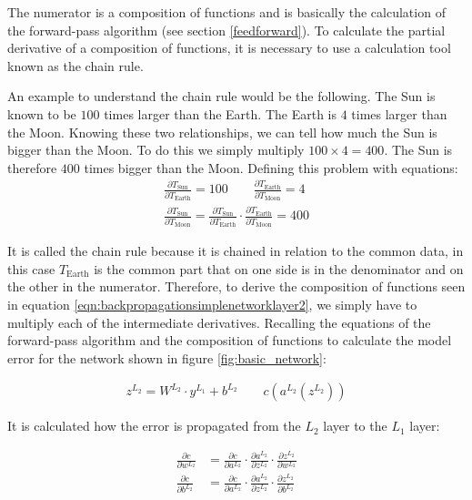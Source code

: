 The numerator is a composition of functions and is basically the calculation of the forward-pass algorithm (see section \ref{feedforward}). To calculate the partial derivative of a composition of functions, it is necessary to use a calculation tool known as the chain rule.
\newline


An example to understand the chain rule would be the following. The Sun is known to be $100$ times larger than the Earth. The Earth is $4$ times larger than the Moon. Knowing these two relationships, we can tell how much the Sun is bigger than the Moon. To do this we simply multiply $100 \times 4 = 400$. The Sun is therefore $400$ times bigger than the Moon. Defining this problem with equations:
\begin{equation}
\begin{split}
    \frac{\partial T_{\text{Sun}}}{\partial T_{\text{Earth}}} = 100
    \qquad
    \frac{\partial T_{\text{Earth}}}{\partial T_{\text{Moon}}} = 4 \\
    \frac{\partial T_{\text{Sun}}}{\partial T_{\text{Moon}}} = \frac{\partial T_{\text{Sun}}}{\partial T_{\text{Earth}}} \cdot \frac{\partial T_{\text{Earth}}}{\partial T_{\text{Moon}}} = 400 \nonumber
\end{split}
\end{equation}


It is called the chain rule because it is chained in relation to the common data, in this case $T_\text{Earth}$ is the common part that on one side is in the denominator and on the other in the numerator. Therefore, to derive the composition of functions seen in equation \ref{eqn:backpropagationsimplenetworklayer2}, we simply have to multiply each of the intermediate derivatives. Recalling the equations of the forward-pass algorithm and the composition of functions to calculate the model error for the network shown in figure \ref{fig:basic_network}:


\begin{equation}
\begin{split}
    z^{L_2} = W^{L_2} \cdot y^{L_1} + b^{L_2}
    \qquad
    c(a^{L_2}(z^{L_2}))
\end{split}
\end{equation}

It is calculated how the error is propagated from the $L_2$ layer to the $L_1$ layer:

\begin{equation}
\begin{split}
     \frac{\partial c}{\partial w^{L_2}} &= \frac{\partial c}{\partial a^{L_2}} \cdot \frac{\partial a^{L_2}}{\partial z^{L_2}} \cdot \frac{\partial z^{L_2}}{\partial w^{L_2}} \\
     \frac{\partial c}{\partial b^{L_2}} &= \frac{\partial c}{\partial a^{L_2}} \cdot \frac{\partial a^{L_2}}{\partial z^{L_2}} \cdot \frac{\partial z^{L_2}}{\partial b^{L_2}}
\end{split}
 \label{eqn:backpropagationlayer2}
\end{equation}

